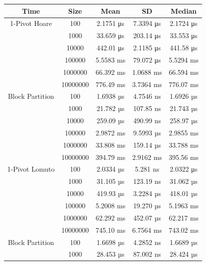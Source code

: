 \documentclass{article}
\begin{document}
\begin{center}
    \small
    \begin{tabular}{ |c c | c c c| }
        \hline
        Time            & Size     & Mean         & SD          & Median \\
        \hline
        1-Pivot Hoare   & 100      & 2.1751 μs    & 7.3394 μs   & 2.1724 μs \\
                        & 1000     & 33.659 μs    & 203.14 μs   & 33.553 μs \\
                        & 10000    & 442.01 μs    & 2.1185 μs   & 441.58 μs \\
                        & 100000   & 5.5583 ms    & 79.072 μs   & 5.5294 ms \\
                        & 1000000  & 66.392 ms    & 1.0688 ms   & 66.594 ms \\
                        & 10000000 & 776.49 ms    & 3.7364 ms   & 776.07 ms \\
        Block Partition & 100      & 1.6938 µs    & 4.7546 ns   & 1.6926 µs \\
                        & 1000     & 21.782 µs    & 107.85 ns   & 21.743 µs \\
                        & 10000    & 259.09 µs    & 490.99 ns   & 258.97 µs \\
                        & 100000   & 2.9872 ms    & 9.5993 µs   & 2.9855 ms \\
                        & 1000000  & 33.808 ms 	  & 159.14 µs   & 33.788 ms \\
                        & 10000000 & 394.79 ms    & 2.9162 ms   & 395.56 ms \\
        \hline
        1-Pivot Lomuto  & 100      & 2.0334 µs    & 5.281 ns    & 2.0322 μs \\
                        & 1000     & 31.105 µs    & 123.19 ns   & 31.062 µs \\
                        & 10000    & 419.93 µs    & 3.2284 µs   & 418.01 µs \\
                        & 100000   & 5.2008 ms    & 19.270 µs   & 5.1963 ms \\
                        & 1000000  & 62.292 ms    & 452.07 µs   & 62.217 ms \\
                        & 10000000 & 745.10 ms    & 6.7564 ms   & 743.02 ms \\
        Block Partition & 100      & 1.6698 µs    & 4.2852 ns   & 1.6689 µs \\
                        & 1000     & 28.453 µs    & 87.002 ns   & 28.424 µs \\

\end{tabular}
\end{center}
\end{document}
